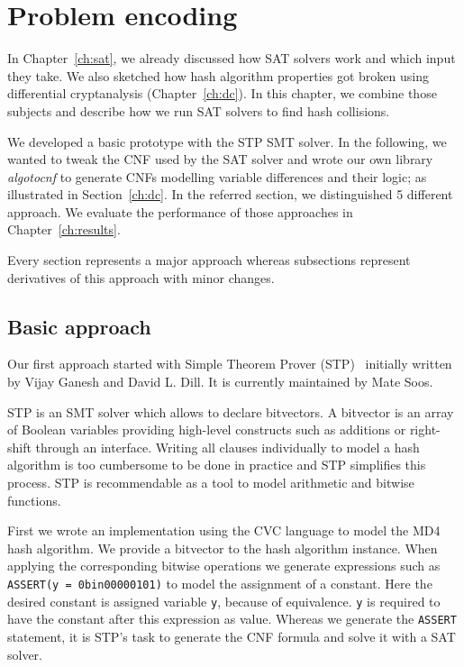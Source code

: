 \renewcommand*\chappic{img/encoding-bw.pdf}
\renewcommand*\chapquote{There is concensus that encoding techniques usually have a dramatic impact on the efficiency of the SAT solver}
\renewcommand*\chapquotesrc{Magnus Bj\"ork}
\chapter{Problem encoding}
\label{ch:enc}

In Chapter~\ref{ch:sat}, we already discussed how SAT solvers
work and which input they take. We also sketched how hash algorithm
properties got broken using differential cryptanalysis
(Chapter~\ref{ch:dc}). In this chapter, we combine those
subjects and describe how we run SAT solvers to find hash collisions.

We developed a basic prototype with the STP SMT solver. In the following,
we wanted to tweak the CNF used by the SAT solver and wrote
our own library \emph{algotocnf} to generate CNFs modelling
variable differences and their logic; as illustrated in Section~\ref{ch:dc}.
In the referred section, we distinguished 5 different approach. We evaluate
the performance of those approaches in Chapter~\ref{ch:results}.

Every section represents a major approach whereas subsections
represent derivatives of this approach with minor changes.

\section{Basic approach}
\label{sec:enc-stp}
%
Our first approach started with Simple Theorem Prover (STP)~\cite{stp}
initially written by Vijay Ganesh and David L. Dill.
It is currently maintained by Mate Soos.

STP is an SMT solver which allows to declare bitvectors. A bitvector is an array of
Boolean variables providing high-level constructs such as additions or right-shift
through an interface. Writing all clauses individually to model a hash algorithm
is too cumbersome to be done in practice and STP simplifies this process.
STP is recommendable as a tool to model arithmetic and bitwise functions.

First we wrote an implementation using the CVC language to model the MD4 hash algorithm.
We provide a bitvector to the hash algorithm instance. When applying the corresponding
bitwise operations we generate expressions such as \texttt{ASSERT(y = 0bin00000101)}
to model the assignment of a constant. Here the desired constant is assigned variable
\texttt{y}, because of equivalence. \texttt{y} is required to have the constant
after this expression as value. Whereas we generate the \texttt{ASSERT} statement,
it is STP's task to generate the CNF formula and solve it with a SAT solver.

